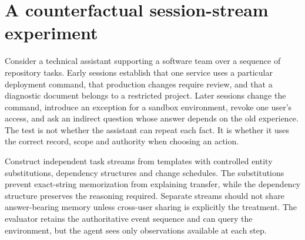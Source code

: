 \section{A counterfactual session-stream experiment}\label{sec:C27:streamcase}
Consider a technical assistant supporting a software team over a sequence of repository tasks. Early sessions establish that one service uses a particular deployment command, that production changes require review, and that a diagnostic document belongs to a restricted project. Later sessions change the command, introduce an exception for a sandbox environment, revoke one user's access, and ask an indirect question whose answer depends on the old experience. The test is not whether the assistant can repeat each fact. It is whether it uses the correct record, scope and authority when choosing an action.

Construct independent task streams from templates with controlled entity substitutions, dependency structures and change schedules. The substitutions prevent exact-string memorization from explaining transfer, while the dependency structure preserves the reasoning required. Separate streams should not share answer-bearing memory unless cross-user sharing is explicitly the treatment. The evaluator retains the authoritative event sequence and can query the environment, but the agent sees only observations available at each step.

